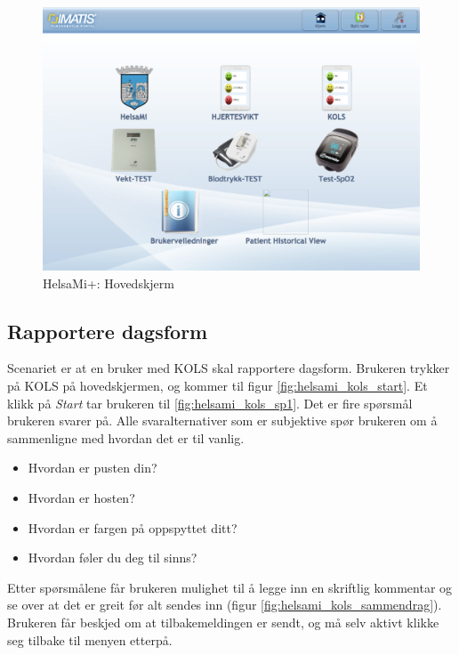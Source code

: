 \begin{figure}
\includegraphics[width=1.0\textwidth,center]{fig/helsami/hovedskjerm}
\caption{HelsaMi+: Hovedskjerm}
\label{fig:helsami_hovedskjerm}
\end{figure}

\subsection{Rapportere dagsform}
Scenariet er at en bruker med KOLS skal rapportere dagsform. Brukeren trykker på KOLS på hovedskjermen,
og kommer til figur \ref{fig:helsami_kols_start}. Et klikk på \textit{Start} tar brukeren til \ref{fig:helsami_kols_sp1}.
Det er fire spørsmål brukeren svarer på. Alle svaralternativer som er subjektive spør brukeren om å sammenligne med
hvordan det er til vanlig.

\begin{itemize}
  \tightlist
  \item Hvordan er pusten din?
  \item Hvordan er hosten?
  \item Hvordan er fargen på oppspyttet ditt?
  \item Hvordan føler du deg til sinns?
\end{itemize}

Etter spørsmålene får brukeren mulighet til å legge inn en skriftlig kommentar og se over at det er greit
før alt sendes inn (figur \ref{fig:helsami_kols_sammendrag}). Brukeren får beskjed om at tilbakemeldingen er sendt,
og må selv aktivt klikke seg tilbake til menyen etterpå.

